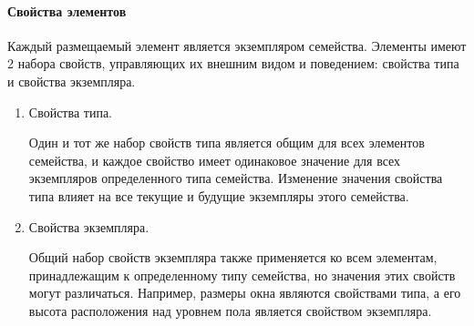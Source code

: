 \paragraph{Свойства элементов}

Каждый размещаемый элемент является экземпляром семейства.
Элементы имеют 2 набора свойств, управляющих их внешним видом и поведением:
свойства типа и свойства экземпляра.%
\cite{DocRevit}

\begin{enumerate}
    \item {
        Свойства типа.

        Один и тот же набор свойств типа является общим для всех элементов семейства,
        и каждое свойство имеет одинаковое значение для всех экземпляров определенного типа семейства.
        Изменение значения свойства типа влияет на все текущие и будущие экземпляры этого семейства.
    }
    \item {
        Свойства экземпляра.

        Общий набор свойств экземпляра также применяется ко всем элементам,
        принадлежащим к определенному типу семейства,
        но значения этих свойств могут различаться.
        Например, размеры окна являются свойствами типа,
        а его высота расположения над уровнем пола является свойством экземпляра.
    }
\end{enumerate}

